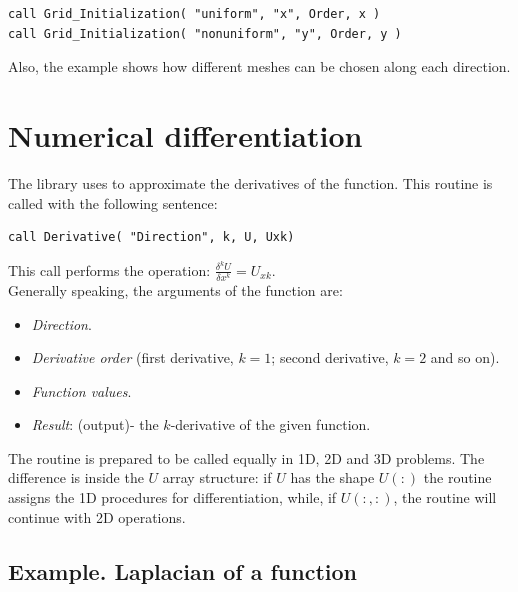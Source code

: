 \begin{blueframed}
\begin{lstlisting}
call Grid_Initialization( "uniform", "x", Order, x )
call Grid_Initialization( "nonuniform", "y", Order, y )
\end{lstlisting}
\end{blueframed}

Also, the example shows how different meshes can be chosen along each direction.
\\

\vspace{1cm}

\section{Numerical differentiation}


The library uses  to approximate the derivatives of the
function. This routine is called with the following sentence: 

\begin{blueframed}
\begin{lstlisting}
call Derivative( "Direction", k, U, Uxk) 
\end{lstlisting}
\end{blueframed}

This call performs the operation: $\frac{\delta^k U}{\delta x^k}=U_{xk}$.\\

Generally speaking, the arguments of the function are: 

\begin{itemize}
  \item \textit{Direction}.
  \item \textit{Derivative order} (first derivative, $k=1$; second derivative,
  $k=2$ and so on).
  \item \textit{Function values}. 
  \item \textit{Result}: (output)- the $k$-derivative of the given function. 
\end{itemize}

The routine is prepared to be called equally in 1D, 2D and 3D problems. The
difference is inside the $U$ array structure: if $U$ has the shape $U(:)$ the
routine assigns the 1D procedures for differentiation, while, if $U(:,:)$, the
routine will continue with 2D operations.\\

\subsection*{Example. Laplacian of a function}

